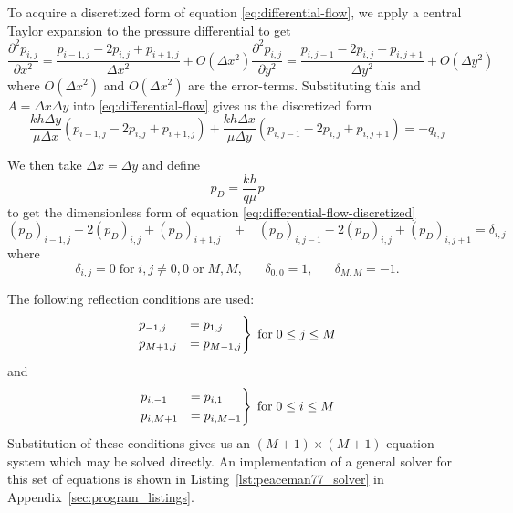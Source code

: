 To acquire a discretized form of equation \eqref{eq:differential-flow}, we apply a central Taylor expansion to the pressure differential to get
\begin{subequations}
    \begin{equation}
        \frac{\partial^2 p_{i,j}}{\partial x^2} = \frac{p_{i-1,j} -2p_{i,j} + p_{i+1,j}}{\Delta x^2} + O(\Delta x^2)
    \end{equation}
    \begin{equation}
        \frac{\partial^2 p_{i,j}}{\partial y^2} = \frac{p_{i,j-1} -2p_{i,j} + p_{i,j+1}}{\Delta y^2} + O(\Delta y^2)
    \end{equation}
\end{subequations}
where $O(\Delta x^2)$ and $O(\Delta x^2)$ are the error-terms. Substituting this and $A=\Delta x \Delta y$ into \eqref{eq:differential-flow} gives us the discretized form 
\begin{equation}
    \label{eq:differential-flow-discretized}
    \frac{kh \Delta y}{\mu \Delta x} \left( p_{i-1,j} -2p_{i,j} + p_{i+1,j} \right) + \frac{kh \Delta x}{\mu \Delta y} \left( p_{i,j-1} -2p_{i,j} + p_{i,j+1} \right) = -q_{i,j}
\end{equation}

We then take $\Delta x = \Delta y$ and define 
\begin{equation}
    p_D = \frac{kh}{q\mu} p
\end{equation}
to get the dimensionless form of equation \eqref{eq:differential-flow-discretized} \cite{Peaceman1978Interpretation}
\begin{equation}
     (p_D)_{i-1,j} -2(p_D)_{i,j} + (p_D)_{i+1,j} \;\;\; + \;\;\; (p_D)_{i,j-1} -2(p_D)_{i,j} + (p_D)_{i,j+1}  = \delta_{i,j}
\end{equation}
where
\begin{equation}
    \delta_{i,j} = 0 \;\mathrm{for}\; i,j \neq 0,0 \;\mathrm{or}\; M,M, \;\;\;\;\;\;
    \delta_{0,0} = 1, \;\;\;\;\;\;
    \delta_{M,M} = -1.
\end{equation}

The following reflection conditions are used:
\begin{equation}
    \begin{rcases}
        p_{-1,j} &= p_{1,j} \\
        p_{M+1,j} &= p_{M-1,j}
    \end{rcases} \; \mathrm{for} \; 0\leq j \leq M
\end{equation}
and
\begin{equation}
    \begin{rcases}
        p_{i,-1} &= p_{i,1} \\
        p_{i,M+1} &= p_{i,M-1}
    \end{rcases} \; \mathrm{for} \; 0\leq i \leq M
\end{equation}
Substitution of these conditions gives us an $(M+1)\times (M+1)$ equation system which may be solved directly. An implementation of a general solver for this set of equations is shown in Listing~\ref{lst:peaceman77_solver} in Appendix~\ref{sec:program_listings}.


